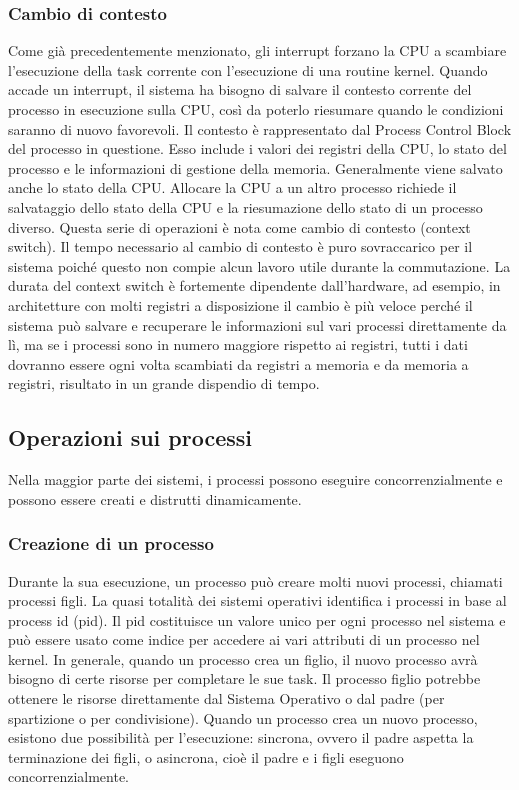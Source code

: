 \documentclass[a4]{article}
\begin{document}
\subsubsection{Cambio di contesto}
Come già precedentemente menzionato, gli interrupt forzano la CPU a scambiare l'esecuzione della task corrente con l'esecuzione di una routine kernel. Quando accade un interrupt, il sistema ha bisogno di salvare il contesto corrente del processo in esecuzione sulla CPU, così da poterlo riesumare quando le condizioni saranno di nuovo favorevoli. Il contesto è rappresentato dal Process Control Block del processo in questione. Esso include i valori dei registri della CPU, lo stato del processo e le informazioni di gestione della memoria. Generalmente viene salvato anche lo stato della CPU. \newline
Allocare la CPU a un altro processo richiede il salvataggio dello stato della CPU e la riesumazione dello stato di un processo diverso. Questa serie di operazioni è nota come cambio di contesto (context switch). \newline
Il tempo necessario al cambio di contesto è puro sovraccarico per il sistema poiché questo non compie alcun lavoro utile durante la commutazione. La durata del context switch è fortemente dipendente dall'hardware, ad esempio, in architetture con molti registri a disposizione il cambio è più veloce perché il sistema può salvare e recuperare le informazioni sul vari processi direttamente da lì, ma se i processi sono in numero maggiore rispetto ai registri, tutti i dati dovranno essere ogni volta scambiati da registri a memoria e da memoria a registri, risultato in un grande dispendio di tempo.

\subsection{Operazioni sui processi}
Nella maggior parte dei sistemi, i processi possono eseguire concorrenzialmente e possono essere creati e distrutti dinamicamente.

\subsubsection{Creazione di un processo}
Durante la sua esecuzione, un processo può creare molti nuovi processi, chiamati processi figli. La quasi totalità dei sistemi operativi identifica i processi in base al process id (pid). Il pid costituisce un valore unico per ogni processo nel sistema e può essere usato come indice per accedere ai vari attributi di un processo nel kernel. \newline
In generale, quando un processo crea un figlio, il nuovo processo avrà bisogno di certe risorse per completare le sue task. Il processo figlio potrebbe ottenere le risorse direttamente dal Sistema Operativo o dal padre (per spartizione o per condivisione). \newline
Quando un processo crea un nuovo processo, esistono due possibilità per l'esecuzione: sincrona, ovvero il padre aspetta la terminazione dei figli, o asincrona, cioè il padre e i figli eseguono concorrenzialmente.
\end{document}
